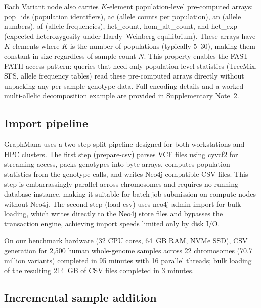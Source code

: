 \documentclass[pdflatex,sn-nature]{sn-jnl}
\begin{document}
Each Variant node also carries $K$-element population-level pre-computed arrays: pop\_ids (population identifiers), ac (allele counts per population), an (allele numbers), af (allele frequencies), het\_count, hom\_alt\_count, and het\_exp (expected heterozygosity under Hardy--Weinberg equilibrium). These arrays have $K$ elements where $K$ is the number of populations (typically 5--30), making them constant in size regardless of sample count $N$. This property enables the FAST PATH access pattern: queries that need only population-level statistics (TreeMix, SFS, allele frequency tables) read these pre-computed arrays directly without unpacking any per-sample genotype data. Full encoding details and a worked multi-allelic decomposition example are provided in Supplementary Note~2.

\subsection*{Import pipeline}

GraphMana uses a two-step split pipeline designed for both workstations and HPC clusters. The first step (prepare-csv) parses VCF files using cyvcf2 for streaming access, packs genotypes into byte arrays, computes population statistics from the genotype calls, and writes Neo4j-compatible CSV files. This step is embarrassingly parallel across chromosomes and requires no running database instance, making it suitable for batch job submission on compute nodes without Neo4j. The second step (load-csv) uses neo4j-admin import for bulk loading, which writes directly to the Neo4j store files and bypasses the transaction engine, achieving import speeds limited only by disk I/O.

On our benchmark hardware (32 CPU cores, 64~GB RAM, NVMe SSD), CSV generation for 2,500 human whole-genome samples across 22 chromosomes (70.7 million variants) completed in 95 minutes with 16 parallel threads; bulk loading of the resulting 214~GB of CSV files completed in 3 minutes.

\subsection*{Incremental sample addition}
\end{document}
